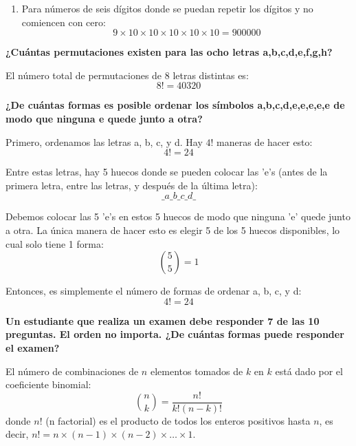 \documentclass[answers]{exam} %
\begin{document}
\begin{questions}
\begin{solution}
\begin{enumerate}[label=\alph*.]
            \item Para números de seis dígitos donde se puedan repetir los dígitos y no comiencen con cero:
                  \[
                      9 \times 10 \times 10 \times 10 \times 10 \times 10 = 900000
                  \]
        \end{enumerate}
    \end{solution}

    \vspace{0.5cm}

    \question \large\textbf{¿Cuántas permutaciones existen para las ocho letras a,b,c,d,e,f,g,h?}
    \begin{solution}
        El número total de permutaciones de 8 letras distintas es:
        \[
            8! = 40320
        \]
    \end{solution}

    \vspace{0.5cm}

    \question \large\textbf{¿De cuántas formas es posible ordenar los símbolos a,b,c,d,e,e,e,e,e de modo que ninguna e quede junto a otra?}
    \begin{solution}
        Primero, ordenamos las letras a, b, c, y d. Hay \(4!\) maneras de hacer esto:
        \[
            4! = 24
        \]

        Entre estas letras, hay 5 huecos donde se pueden colocar las 'e's (antes de la primera letra, entre las letras, y después de la última letra):
        \[
            \_ a \_ b \_ c \_ d \_
        \]

        Debemos colocar las 5 'e's en estos 5 huecos de modo que ninguna 'e' quede junto a otra. La única manera de hacer esto es elegir 5 de los 5 huecos disponibles, lo cual solo tiene 1 forma:
        \[
            \binom{5}{5} = 1
        \]

        Entonces, es simplemente el número de formas de ordenar a, b, c, y d:
        \[
            4! = 24
        \]
    \end{solution}

    \vspace{0.5cm}


    \question \large\textbf{Un estudiante que realiza un examen debe responder 7 de las 10 preguntas. El orden no importa. ¿De cuántas formas puede responder el examen?}
    \begin{solution}
        El número de combinaciones de \(n\) elementos tomados de \(k\) en \(k\) está dado por el coeficiente binomial:
        \[
            \binom{n}{k} = \frac{n!}{k!(n-k)!}
        \]
        donde \(n!\) (n factorial) es el producto de todos los enteros positivos hasta \(n\), es decir, \(n! = n \times (n-1) \times (n-2) \times \ldots \times 1\).


\end{solution}
\end{questions}
\end{document}
